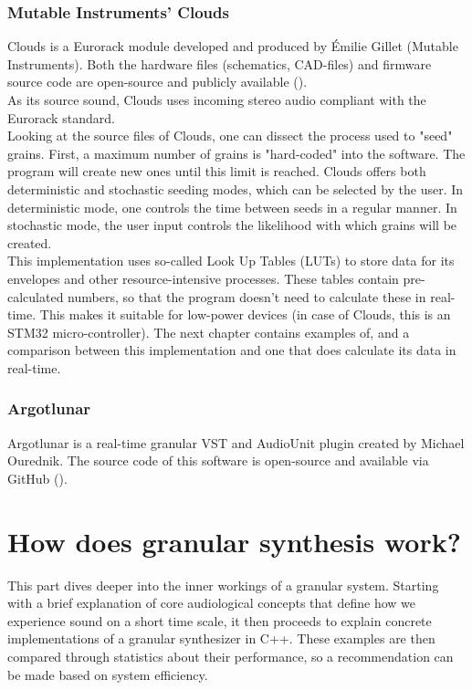 \documentclass[10pt, twocolumn]{IEEEtran}
\begin{document}
\subsubsection{Mutable Instruments' Clouds}
Clouds is a Eurorack module developed and produced by Émilie Gillet (Mutable Instruments). Both the hardware files (schematics, CAD-files) and firmware source code are open-source and publicly available (\cite{clouds}).\\
As its source sound, Clouds uses incoming stereo audio compliant with the Eurorack standard.\\
Looking at the source files of Clouds, one can dissect the process used to "seed" grains. First, a maximum number of grains is "hard-coded" into the software. The program will create new ones until this limit is reached. Clouds offers both deterministic and stochastic seeding modes, which can be selected by the user. In deterministic mode, one controls the time between seeds in a regular manner. In stochastic mode, the user input controls the likelihood with which grains will be created.\\
This implementation uses so-called Look Up Tables (LUTs) to store data for its envelopes and other resource-intensive processes. These tables contain pre-calculated numbers, so that the program doesn't need to calculate these in real-time. This makes it suitable for low-power devices (in case of Clouds, this is an STM32 micro-controller). The next chapter contains examples of, and a comparison between this implementation and one that does calculate its data in real-time.

\subsubsection{Argotlunar}
Argotlunar is a real-time granular VST and AudioUnit plugin created by Michael Ourednik. The source code of this software is open-source and available via GitHub (\cite{argotlunar}).


\section{How does granular synthesis work?}
This part dives deeper into the inner workings of a granular system. Starting with a brief explanation of core audiological concepts that define how we experience sound on a short time scale, it then proceeds to explain concrete implementations of a granular synthesizer in C++. These examples are then compared through statistics about their performance, so a recommendation can be made based on system efficiency.
\end{document}
